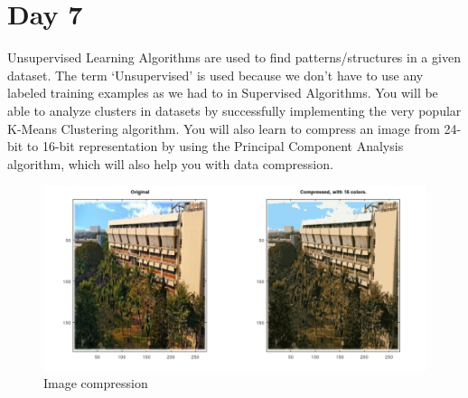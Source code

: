 \documentclass[11pt]{article}
\begin{document}
\section{Day 7}
Unsupervised Learning Algorithms are used to find patterns/structures in a given dataset. The term `Unsupervised' is used because we don't have to use any labeled training examples as we had to in Supervised Algorithms. You will be able to analyze clusters in datasets by successfully implementing the very popular K-Means Clustering algorithm. You will also learn to compress an image from 24-bit to 16-bit representation by using the Principal Component Analysis algorithm, which will also help you with data compression.
\begin{figure}[h!]
\begin{center}
\includegraphics[scale=.6]{img/icKmC.png}
\end{center}
{\caption*{Image compression}}
    \centering
    \qquad

\end{figure}
\end{document}
